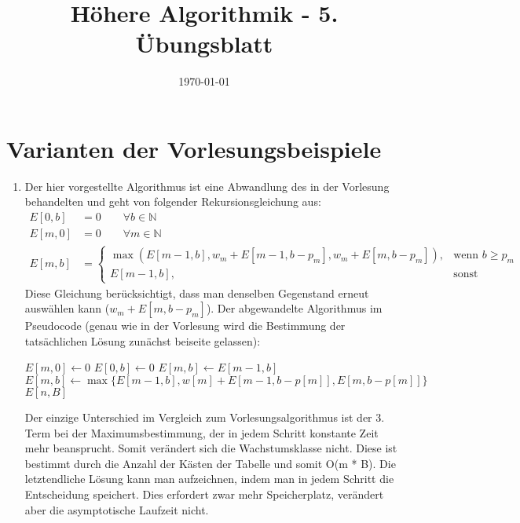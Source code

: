 \documentclass[a4paper,10pt]{scrartcl}
\title{H\"ohere Algorithmik - 5. \"Ubungsblatt}
\author{\Authors}
\date{\today}
\begin{document}
\maketitle

\section{Varianten der Vorlesungsbeispiele}
\begin{enumerate}
 \item
  Der hier vorgestellte Algorithmus ist eine Abwandlung des in der Vorlesung behandelten und geht von folgender Rekursionsgleichung aus:
   \begin{align*}
     E[0,b] &= 0 \qquad \forall b \in \mathbb{N} \\
     E[m,0] &= 0 \qquad \forall m \in \mathbb{N} \\
     E[m,b] &= \begin{cases}
                \max(E[m-1,b], w_m + E[m-1, b-p_m], w_m + E[m, b - p_m]), & \text{wenn } b \geq p_m \\
                E[m-1,b], & \text{sonst}
               \end{cases}
    \end{align*}
  Diese Gleichung berücksichtigt, dass man denselben Gegenstand erneut auswählen kann ($w_m + E[m, b - p_m]$).
  Der abgewandelte Algorithmus im Pseudocode (genau wie in der Vorlesung wird die Bestimmung der tatsächlichen Lösung zunächst beiseite gelassen):
\begin{center}
        \begin{algorithmic}
                \STATE $E[m,0] \gets 0$
            \ENDFOR
                \STATE $E[0,b] \gets 0$
            \ENDFOR
                        \STATE $E[m,b] \gets E[m-1,b]$
                    \ELSE
                        \STATE $E[m,b] \gets \max\{E[m-1,b], w[m] + E[m-1,b-p[m]], E[m, b - p[m]]\}$
                    \ENDIF
                \ENDFOR
            \ENDFOR
            \RETURN $E[n, B]$
        \end{algorithmic}
       \end{center}
  Der einzige Unterschied im Vergleich zum Vorlesungsalgorithmus ist der 3. Term bei der Maximumsbestimmung, der in jedem Schritt konstante Zeit mehr beansprucht.
 Somit verändert sich die Wachstumsklasse nicht. Diese ist bestimmt durch die Anzahl der Kästen der Tabelle und somit O(m * B).
 Die letztendliche Lösung kann man aufzeichnen, indem man in jedem Schritt die Entscheidung speichert. Dies erfordert zwar mehr Speicherplatz, verändert aber die asymptotische Laufzeit nicht.


\end{enumerate}
\end{document}
